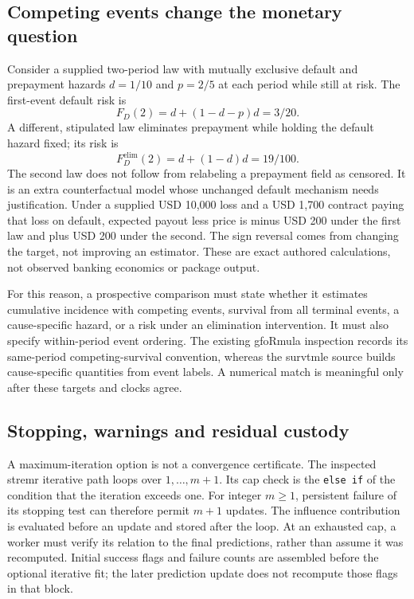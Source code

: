 \subsection{Competing events change the monetary question}
\label{eq:exec23-longr-events}
Consider a supplied two-period law with mutually exclusive default and
prepayment hazards $d=1/10$ and $p=2/5$ at each period while still at risk.
The first-event default risk is
\[
 F_D(2)=d+(1-d-p)d=3/20.
\]
A different, stipulated law eliminates prepayment while holding the default
hazard fixed; its risk is
\[
 F_D^{\mathrm{elim}}(2)=d+(1-d)d=19/100.
\]
The second law does not follow from relabeling a prepayment field as censored.
It is an extra counterfactual model whose unchanged default mechanism needs
justification. Under a supplied USD 10,000 loss and a USD 1,700 contract
paying that loss on default, expected payout less price is minus USD 200
under the first law and plus USD 200 under the second. The sign reversal
comes from changing the target, not improving an estimator. These are exact
authored calculations, not observed banking economics or package output.
\citep{exec23_longr_reference}

For this reason, a prospective comparison must state whether it estimates
cumulative incidence with competing events, survival from all terminal
events, a cause-specific hazard, or a risk under an elimination intervention.
It must also specify within-period event ordering. The existing gfoRmula
inspection records its same-period competing-survival convention, whereas
the survtmle source builds cause-specific quantities from event labels.
A numerical match is meaningful only after these targets and clocks agree.
\citep{exec20_gformula_reuse,exec23_longr_survtmle}

\subsection{Stopping, warnings and residual custody}
A maximum-iteration option is not a convergence certificate. The inspected
stremr iterative path loops over $1,\ldots,m+1$. Its cap check is the
\texttt{else if} of the condition that the iteration exceeds one. For integer
$m\geq1$, persistent failure of its stopping test can therefore permit
$m+1$ updates. The influence contribution is evaluated before an update and
stored after the loop. At an exhausted cap, a worker must verify its relation
to the final predictions, rather than assume it was recomputed. Initial
success flags and failure counts are assembled before the optional iterative
fit; the later prediction update does not recompute those flags in that block.
\citep{exec23_longr_stremr}

